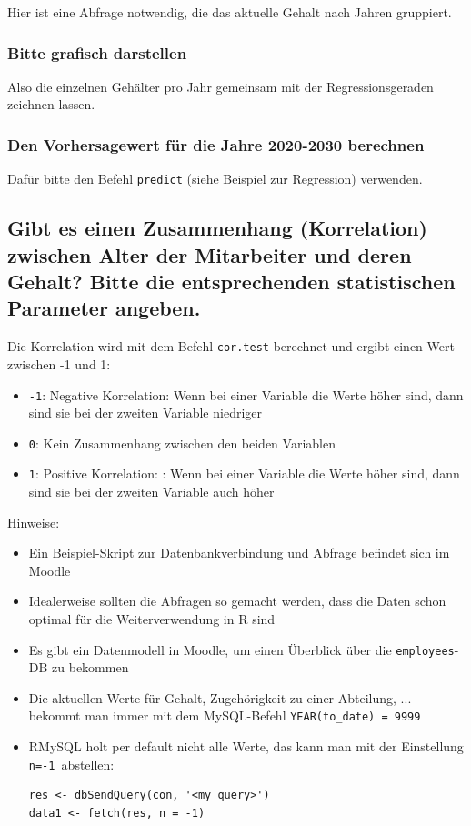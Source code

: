 \documentclass{article}
\begin{document}
Hier ist eine Abfrage notwendig, die das aktuelle Gehalt nach Jahren gruppiert.

\subsubsection{Bitte grafisch darstellen}

Also die einzelnen Gehälter pro Jahr gemeinsam mit der Regressionsgeraden zeichnen lassen.

\subsubsection{Den Vorhersagewert für die Jahre 2020-2030 berechnen}

Dafür bitte den Befehl \texttt{predict} (siehe Beispiel zur Regression) verwenden.

\subsection{Gibt es einen Zusammenhang (Korrelation) zwischen Alter der Mitarbeiter und deren Gehalt?
	Bitte die entsprechenden statistischen Parameter angeben.}


Die Korrelation wird mit dem Befehl \texttt{cor.test} berechnet und ergibt einen Wert zwischen -1 und 1:

\begin{itemize}
	\item \texttt{-1}: Negative Korrelation: Wenn bei einer Variable die Werte höher sind, dann sind sie bei der zweiten Variable niedriger
	\item \texttt{0}: Kein Zusammenhang zwischen den beiden Variablen
	\item \texttt{1}: Positive Korrelation: : Wenn bei einer Variable die Werte höher sind, dann sind sie bei der zweiten Variable auch höher
\end{itemize}
 
 
\underline{Hinweise}: 


\begin{itemize}
	\item Ein Beispiel-Skript zur Datenbankverbindung und Abfrage befindet sich im Moodle
	\item Idealerweise sollten die Abfragen so gemacht werden, dass die Daten schon optimal für die Weiterverwendung in R sind
	\item Es gibt ein Datenmodell in Moodle, um einen Überblick über die \texttt{employees}-DB zu bekommen
	\item Die aktuellen Werte für Gehalt, Zugehörigkeit zu einer Abteilung, ... bekommt man immer mit dem MySQL-Befehl \texttt{YEAR(to\_date) = 9999}
	\item RMySQL holt per default nicht alle Werte, das kann man mit der Einstellung \texttt{n=-1 }abstellen:
	\begin{lstlisting}
res <- dbSendQuery(con, '<my_query>')
data1 <- fetch(res, n = -1)	
	\end{lstlisting}
\end{itemize}	
	
\end{document}

